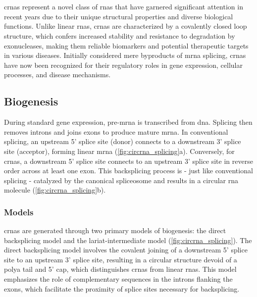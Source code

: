 \section{}
\label{sec:circrnas}

\Glspl{crna} represent a novel class of \glspl{rna} that have garnered
significant attention in recent years due to their unique structural properties
and diverse biological functions.
Unlike linear \glspl{rna}, \glspl{crna} are characterized by a covalently
closed loop structure, which confers increased stability and resistance to
degradation by exonucleases, making them reliable biomarkers and potential
therapeutic targets in various
diseases\supercite{ma_circular_2020,hoque_exploring_2023,wilusz_circular_2017}.
Initially considered mere byproducts of \gls{mrna} splicing, \glspl{crna} have
now been recognized for their regulatory roles in gene expression, cellular
processes, and disease
mechanisms\supercite{cherubini_foxp1_2019,wilusz_360_2018}.

\subsection{Biogenesis}
\label{sec:circrna_biogenesis}
During standard gene expression, pre-\gls{mrna} is transcribed from \gls{dna}.
Splicing then removes introns and joins exons to produce mature
\gls{mrna}\supercite{black_mechanisms_2003}.
In conventional splicing, an upstream 5' splice site (donor) connects to a
downstream 3' splice site (acceptor), forming linear \gls{mrna}
(\cref{fig:circrna_splicing}a).
Conversely, for \glspl{crna}, a downstream 5' splice site connects to an
upstream 3' splice site in reverse order across at least one
exon\supercite{chen_expanding_2020}.
This backsplicing process is - just like conventional splicing - catalyzed by
the canonical spliceosome\supercite{starke_exon_2015} and results in a circular
\gls{rna} molecule (\cref{fig:circrna_splicing}b).

\subsubsection{Models}

\glspl{crna} are generated through two primary models of
biogenesis: the direct backsplicing model and
the lariat-intermediate model (\cref{fig:circrna_splicing}).
The direct backsplicing model involves the covalent joining of a downstream 5'
splice site to an upstream 3' splice site, resulting in a circular structure
devoid of a \gls{polya} tail and 5' cap, which distinguishes \glspl{crna} from
linear \glspl{rna}\supercite{zhang_complementary_2014,ferreira_circular_2018}.
This model emphasizes the role of complementary sequences in the introns
flanking the exons, which facilitate the proximity of splice sites necessary
for backsplicing\supercite{zhang_complementary_2014,meganck_engineering_2021}.

